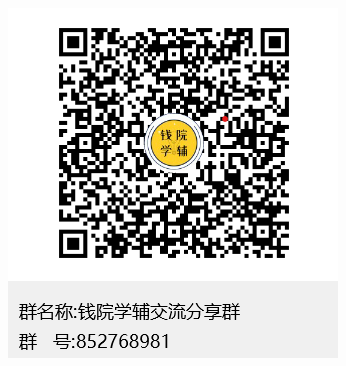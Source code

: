 \begin{figure}[!h]
\begin{minipage}[c]{0.4\textwidth}
		\includegraphics[width=\textwidth]{./template/new_group.png}
	\end{minipage}
\end{figure}

\cleardoublepage
\tableofcontents
